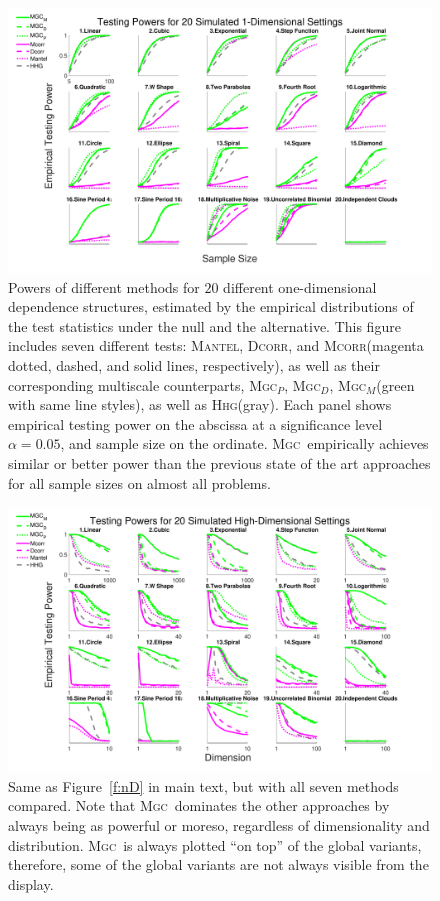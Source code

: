 \documentclass[11pt]{article}
\providecommand{\sct}[1]{{\normalfont\textsc{#1}}}
\newcommand{\Mgc}{\sct{Mgc}}
\newcommand{\Mgcp}{\sct{Mgc$_P$}}
\newcommand{\Mgcd}{\sct{Mgc$_D$}}
\newcommand{\Mgcm}{\sct{Mgc$_M$}}
\newcommand{\Hhg}{\sct{Hhg}}
\newcommand{\Dcorr}{\sct{Dcorr}}
\newcommand{\Mcorr}{\sct{Mcorr}}
\newcommand{\Mantel}{\sct{Mantel}}
\begin{document}
\begin{figure}[htbp]
\includegraphics[width=1.0\textwidth]{../Figures/Fig1DPowerAll}
\caption{
Powers of different methods for $20$ different one-dimensional dependence structures, estimated by the empirical distributions of the test statistics under the null and the alternative.
This figure includes seven different tests: \Mantel, \Dcorr, and \Mcorr (magenta dotted, dashed, and solid lines, respectively), as well as their corresponding multiscale counterparts, \Mgcp, \Mgcd, \Mgcm (green with same line styles), as well as \Hhg (gray).
Each panel shows empirical testing power on the abscissa at a significance level $\alpha=0.05$, and sample size on the ordinate.
\Mgc~empirically achieves similar or better power than the previous state of the art approaches for all sample sizes on almost all problems.}
\label{f:1DAll}
\end{figure}

\begin{figure}[htbp]
\includegraphics[width=1.0\textwidth]{../Figures/FigHDPowerAll}
\caption{
Same as Figure~\ref{f:nD} in main text, but with all seven methods compared. Note that \Mgc~dominates the other approaches by always being as powerful or moreso, regardless of dimensionality and distribution. \Mgc~is always plotted ``on top'' of the global variants, therefore, some of the global variants are not always visible from the display.}
\label{f:nDAll}
\end{figure}
\end{document}
